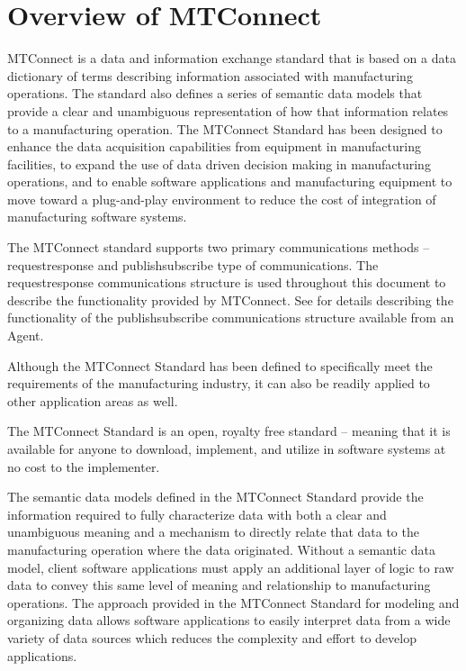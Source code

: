 \section{Overview of MTConnect}

MTConnect is a data and information exchange standard that is based on a \gls{data dictionary} of terms describing information associated with manufacturing operations.  The standard also defines a series of \glspl{semantic data model} that provide a clear and unambiguous representation of how that information relates to a manufacturing operation.  The MTConnect Standard has been designed to enhance the data acquisition capabilities from equipment in manufacturing facilities, to expand the use of data driven decision making in manufacturing operations, and to enable software applications and manufacturing equipment to move toward a plug-and-play environment to reduce the cost of integration of manufacturing software systems.

The MTConnect standard supports two primary communications methods – \gls{requestresponse} and \gls{publishsubscribe} type of communications.  The \gls{requestresponse} communications structure is used throughout this document to describe the functionality provided by MTConnect.  See  for details describing the functionality of the \gls{publishsubscribe} communications structure available from an \gls{Agent}. 

Although the MTConnect Standard has been defined to specifically meet the requirements of the manufacturing industry, it can also be readily applied to other application areas as well.

The MTConnect Standard is an open, royalty free standard – meaning that it is available for anyone to download, implement, and utilize in software systems at no cost to the implementer.

The \glspl{semantic data model} defined in the MTConnect Standard provide the information required to fully characterize data with both a clear and unambiguous meaning and a mechanism to directly relate that data to the manufacturing operation where the data originated.  Without a \gls{semantic data model}, client software applications must apply an additional layer of logic to raw data to convey this same level of meaning and relationship to manufacturing operations.  The approach provided in the MTConnect Standard for modeling and organizing data allows software applications to easily interpret data from a wide variety of data sources which reduces the complexity and effort to develop applications.

